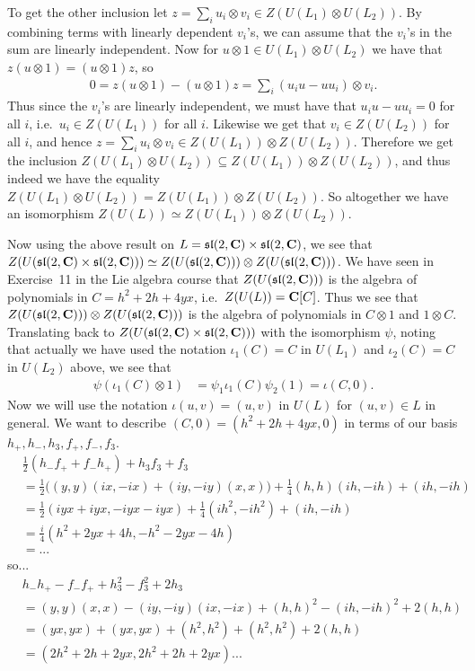 To get the other inclusion let $z=\sum_i u_i\otimes v_i \in Z(U(L_1)\otimes U(L_2))$. By combining terms with linearly dependent $v_i$'s, we can assume that the $v_i$'s in the sum are linearly independent. Now for $u\otimes 1\in U(L_1)\otimes U(L_2)$ we have that $z(u\otimes 1)=(u\otimes 1)z$, so 
\begin{align*}
  0 = z(u\otimes 1) - (u\otimes 1)z = \sum_i (u_iu - uu_i)\otimes v_i.
\end{align*}
Thus since the $v_i$'s are linearly independent, we must have that $u_iu-uu_i=0$ for all $i$, i.e.\ $u_i\in Z(U(L_1))$ for all $i$. Likewise we get that $v_i\in Z(U(L_2))$ for all $i$, and hence $z=\sum_i u_i\otimes v_i \in Z(U(L_1))\otimes Z(U(L_2))$. Therefore we get the inclusion $Z(U(L_1)\otimes U(L_2))\subseteq Z(U(L_1))\otimes Z(U(L_2))$, and thus indeed we have the equality $Z(U(L_1)\otimes U(L_2))=Z(U(L_1))\otimes Z(U(L_2))$. So altogether we have an isomorphism $Z(U(L))\simeq Z(U(L_1))\otimes Z(U(L_2))$.

Now using the above result on $L=\mathfrak{sl}(2,\mathbf{C})\times \mathfrak{sl}(2,\mathbf{C})$, we see that $Z(U(\mathfrak{sl}(2,\mathbf{C})\times \mathfrak{sl}(2,\mathbf{C})))\simeq Z(U(\mathfrak{sl}(2,\mathbf{C})))\otimes Z(U(\mathfrak{sl}(2,\mathbf{C})))$. We have seen in Exercise~11 in the Lie algebra course that $Z(U(\mathfrak{sl}(2,\mathbf{C})))$ is the algebra of polynomials in $C=h^2+2h+4yx$, i.e.\ $Z(U(L))=\mathbf{C}[C]$. Thus we see that $Z(U(\mathfrak{sl}(2,\mathbf{C})))\otimes Z(U(\mathfrak{sl}(2,\mathbf{C})))$ is the algebra of polynomials in $C\otimes 1$ and $1\otimes C$. Translating back to $Z(U(\mathfrak{sl}(2,\mathbf{C})\times \mathfrak{sl}(2,\mathbf{C})))$ with the isomorphism $\psi$, noting that actually we have used the notation $\iota_1(C)=C$ in $U(L_1)$ and $\iota_2(C)=C$ in $U(L_2)$ above, we see that
\begin{align*}
  \psi(\iota_1(C)\otimes 1) &= \psi_1\iota_1(C)\psi_2(1) = \iota(C,0).
\end{align*}
Now we will use the notation $\iota(u,v)=(u,v)$ in $U(L)$ for $(u,v)\in L$ in general. We want to describe $(C,0)=(h^2+2h+4yx,0)$ in terms of our basis $h_+,h_-,h_3,f_+,f_-,f_3$. 
\begin{align*}
  &\tfrac{1}{2}(h_-f_++f_-h_+)+h_3f_3+f_3\\
  &= \tfrac{1}{2}\bigl( (y,y)(ix,-ix) + (iy,-iy)(x,x) \bigr) + \tfrac{1}{4}(h,h)(ih,-ih) + (ih,-ih) \\
  &= \tfrac{1}{2}(iyx+iyx,-iyx-iyx) + \tfrac{1}{4}(ih^2,-ih^2) + (ih,-ih) \\
  &= \tfrac{i}{4}(h^2+2yx+4h,-h^2-2yx-4h) \\
  &=...
\end{align*}
so...
\begin{align*}
  &h_-h_+ - f_-f_+ + h_3^2 - f_3^2 + 2h_3 \\
  &= (y,y)(x,x) - (iy,-iy)(ix,-ix) + (h,h)^2 - (ih,-ih)^2 + 2(h,h) \\
  &= (yx,yx) + (yx,yx) + (h^2,h^2) + (h^2,h^2) + 2(h,h) \\
  &= (2h^2+2h+2yx,2h^2+2h+2yx)...
\end{align*}

